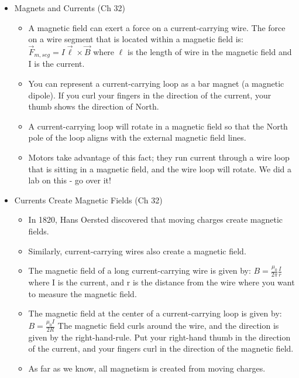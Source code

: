 \begin{itemize}
\item Magnets and Currents (Ch 32)
\begin{itemize}
\item A magnetic field can exert a force on a current-carrying wire.
  The force on a wire segment that is located within a magnetic field
  is: $\displaystyle \vec{F}_{m, seg} = I\vec{\ell} \times \vec{B} $
  where $\ell$ is the length of wire in the magnetic field and I is the
  current.
\item You can represent a current-carrying loop as a bar magnet (a
  magnetic dipole).  If you curl your fingers in the direction of the
  current, your thumb shows the direction of North.
\item A current-carrying loop will rotate in a magnetic field so that
  the North pole of the loop aligns with the external magnetic field
  lines.
\item Motors take advantage of this fact; they run current through a
  wire loop that is sitting in a magnetic field, and the wire loop
  will rotate.  We did a lab on this - go over it!
\end{itemize}

\item Currents Create Magnetic Fields  (Ch 32)
\begin{itemize}
\item In 1820, Hans Oersted discovered that moving charges create magnetic fields.
\item Similarly, current-carrying wires also create a magnetic field.
\item The magnetic field of a long current-carrying wire is given by:
$\displaystyle B = \frac{\mu_0}{2 \pi} \frac{I}{r}$
where I is the current, and r is the distance from the wire where you
want to measure the magnetic field. 
\item The magnetic field at the center of a current-carrying loop is
  given by: $\displaystyle B = \frac{\mu_0 I}{2 R}$ The magnetic field
  curls around the wire, and the direction is given by the
  right-hand-rule.  Put your right-hand thumb in the direction of the
  current, and your fingers curl in the direction of the magnetic
  field.
\item As far as we know, all magnetism is created from moving charges.  
\end{itemize}


\end{itemize}
